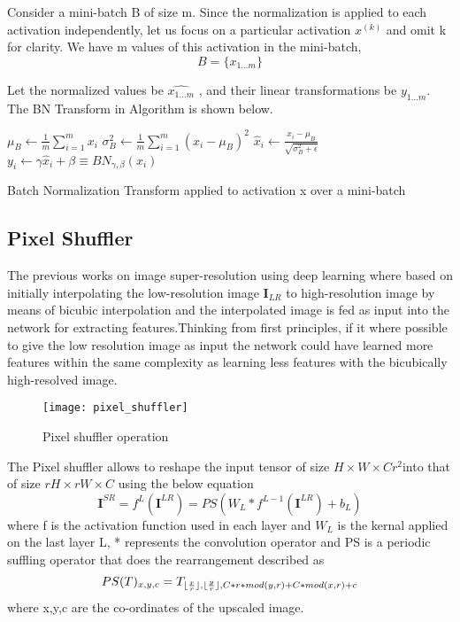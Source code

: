 Consider a mini-batch B of size m. Since the normalization is applied to each activation independently, let us focus on a particular activation $x^{(k)}$ and omit k for clarity. We have m values of this activation in the mini-batch,
\begin{equation}
 B = \{x_{1 \dots m}\}
\end{equation}

Let the normalized values be $\hat{x_{1 \dots m }}$ , and their linear transformations  be $y_{1 \dots m}$. The BN Transform in Algorithm is shown below.

\begin{algorithm}[H]
\DontPrintSemicolon
{}
$\mu_B \leftarrow \frac{1}{m}\sum_{i=1}^{m}x_i$
$\sigma_B^2 \leftarrow \frac{1}{m}\sum_{i=1}^{m}(x_i - \mu_B)^2$  
$\hat x_i \leftarrow \frac{x_i - \mu_B}{\sqrt{\sigma_B^2 + \epsilon}}$  
$y_i \leftarrow \gamma\hat x_i + \beta \equiv BN_{\gamma,\beta}(x_i) $  
\caption{Batch Normalization Transform applied to activation x over a mini-batch}
\label{algo:batchnorm}
\end{algorithm}

\subsection{Pixel Shuffler}
The previous works on image super-resolution using deep learning  where based on initially interpolating the low-resolution image $\textbf{I}_{LR}$ to high-resolution image by means of bicubic interpolation and the interpolated image is fed as input into the network for extracting features.Thinking from first principles, if it where possible to give the low resolution image as input the network could have learned more features within the same complexity as learning less features with the bicubically high-resolved image.
\begin{figure}[h!]
 \centering
 \texttt{[image: pixel\_shuffler]}
 \caption{Pixel shuffler operation}
 \label{fig:pixelshuffler}
\end{figure}

The Pixel shuffler allows to reshape the input tensor of size $ H \times W \times Cr^2 $into that of size $rH \times rW \times C$ using the below equation
\begin{equation}
\textbf{I}^{SR} = f^L(\textbf{I}^{LR}) = PS(W_L * f^{L-1}(\textbf{I}^{LR}) + b_L)
\end{equation}
where f is the activation function used in each layer and $W_L$ is the kernal applied on the last layer L, * represents the convolution operator and  PS is a periodic suffling operator that does the rearrangement described as
\begin{equation}
PS(T)_{x,y,c} = T_{\lfloor\frac{x}{r}\rfloor,\lfloor\frac{y}{r}\rfloor,C*r*mod(y,r) + C*mod(x,r)+c}
\end{equation}
where x,y,c are the co-ordinates of the upscaled image.